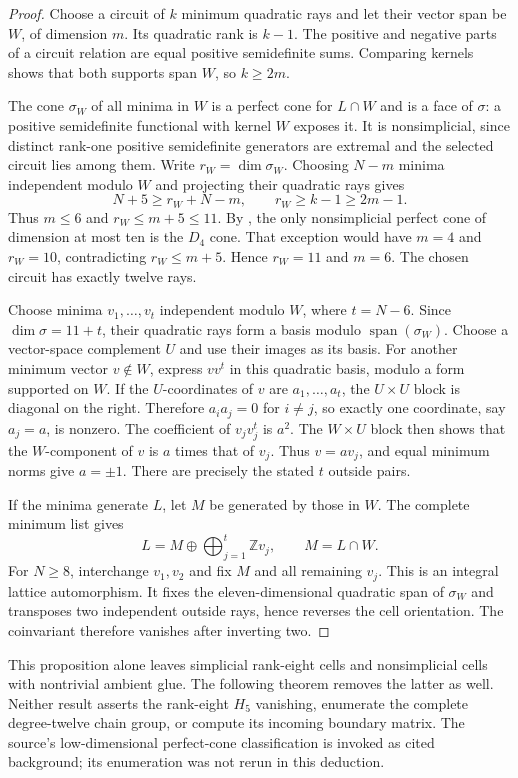\begin{proof}
Choose a circuit of $k$ minimum quadratic rays and let their vector
span be $W$, of dimension $m$. Its quadratic rank is $k-1$.
The positive and negative parts of a circuit relation are equal
positive semidefinite sums. Comparing kernels shows that both
supports span $W$, so $k\geq2m$.

The cone $\sigma_W$ of all minima in $W$ is a perfect cone for
$L\cap W$ and is a face of $\sigma$: a positive semidefinite
functional with kernel $W$ exposes it. It is nonsimplicial, since
distinct rank-one positive semidefinite generators are extremal and
the selected circuit lies among them. Write $r_W=\dim\sigma_W$.
Choosing $N-m$ minima independent modulo $W$ and projecting their
quadratic rays gives
\[
 N+5\geq r_W+N-m,
 \qquad r_W\geq k-1\geq2m-1.
\]
Thus $m\leq6$ and $r_W\leq m+5\leq11$.
By \cite[Theorem~1.1(ii)]{DutourHulekSchurmann2015}, the only
nonsimplicial perfect cone of dimension at most ten is the $D_4$
cone. That exception would have $m=4$ and $r_W=10$, contradicting
$r_W\leq m+5$. Hence $r_W=11$ and $m=6$. The chosen circuit has
exactly twelve rays.

Choose minima $v_1,\ldots,v_t$ independent modulo $W$, where
$t=N-6$. Since $\dim\sigma=11+t$, their quadratic rays form a
basis modulo $\operatorname{span}(\sigma_W)$. Choose a vector-space
complement $U$ and use their images as its basis. For another
minimum vector $v\notin W$, express $vv^t$ in this quadratic basis,
modulo a form supported on $W$. If the $U$-coordinates of $v$ are
$a_1,\ldots,a_t$, the $U\times U$ block is diagonal on the right.
Therefore $a_i a_j=0$ for $i\ne j$, so exactly one coordinate,
say $a_j=a$, is nonzero. The coefficient of $v_jv_j^t$ is $a^2$.
The $W\times U$ block then shows that the $W$-component of $v$
is $a$ times that of $v_j$. Thus $v=av_j$, and equal minimum norms
give $a=\pm1$. There are precisely the stated $t$ outside pairs.

If the minima generate $L$, let $M$ be generated by those in $W$.
The complete minimum list gives
\[
 L=M\oplus\bigoplus_{j=1}^t\mathbb Zv_j,
 \qquad M=L\cap W.
\]
For $N\geq8$, interchange $v_1,v_2$ and fix $M$ and all remaining
$v_j$. This is an integral lattice automorphism. It fixes the
eleven-dimensional quadratic span of $\sigma_W$ and transposes
two independent outside rays, hence reverses the cell orientation.
The coinvariant therefore vanishes after inverting two.
\end{proof}

This proposition alone leaves simplicial rank-eight cells and nonsimplicial
cells with nontrivial ambient glue. The following theorem removes the
latter as well. Neither result asserts the rank-eight
$H_5$ vanishing, enumerate the complete degree-twelve chain group,
or compute its incoming boundary matrix. The source's low-dimensional
perfect-cone classification is invoked as cited background; its
enumeration was not rerun in this deduction.
